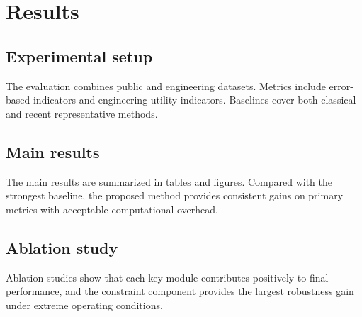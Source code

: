 \section{Results}

\subsection{Experimental setup}
The evaluation combines public and engineering datasets. Metrics include error-based indicators and engineering utility indicators. Baselines cover both classical and recent representative methods.

\subsection{Main results}
The main results are summarized in tables and figures. Compared with the strongest baseline, the proposed method provides consistent gains on primary metrics with acceptable computational overhead.

\subsection{Ablation study}
Ablation studies show that each key module contributes positively to final performance, and the constraint component provides the largest robustness gain under extreme operating conditions.
